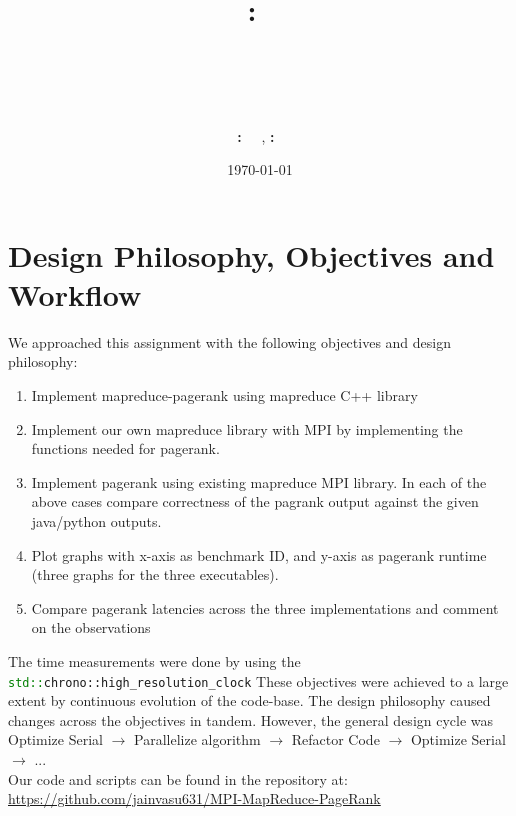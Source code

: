 \documentclass{article}
\title{
    \textmd{\hmwkClass :\ \hmwkClassTitle}\\
    \vspace{2in}
    \textmd{\textbf{\hmwkTitle}}\\
    \textmd{\hmwkSubtitle}\\
    \vspace{3in}
}
\author
{
    \textbf{\hmwkAuthorNameOne:\ \hmwkEntryNumberOne}
    \ ,
    \textbf{\hmwkAuthorNameTwo:\ \hmwkEntryNumberTwo}
}
\date{\today}
\newcommand{\cpp}{\lstinline[language=C++]}
\begin{document}
    
    \maketitle
    \clearpage
    \tableofcontents
    \clearpage
    
    \section{Design Philosophy, Objectives and Workflow}
    
    We approached this assignment with the following objectives and design philosophy:
    \begin{enumerate}
        \item Implement mapreduce-pagerank using mapreduce C++ library
        \item Implement our own mapreduce library with MPI by implementing  the functions needed for pagerank. 
        \item  Implement pagerank using existing mapreduce MPI library.
    In each of the above cases compare correctness of the pagrank output against the given java/python outputs.
        \item Plot graphs with x-axis as benchmark ID, and y-axis as pagerank runtime (three graphs for the three executables).
        \item Compare pagerank latencies across the three implementations and comment on the observations
    \end{enumerate}
    The time measurements were done by using the \cpp{std::chrono::high_resolution_clock} 
    These objectives were achieved to a large extent by continuous evolution of the code-base.
    The design philosophy caused changes across the objectives in tandem. However, the general design cycle was \\
    
    Optimize Serial $\longrightarrow$ Parallelize algorithm $\longrightarrow$ Refactor Code $\longrightarrow$ Optimize Serial $\longrightarrow$ ... \\
    
    Our code and scripts can be found in the repository at:
    {\newline}
    \url{https://github.com/jainvasu631/MPI-MapReduce-PageRank}
    \clearpage
    
\end{document}
